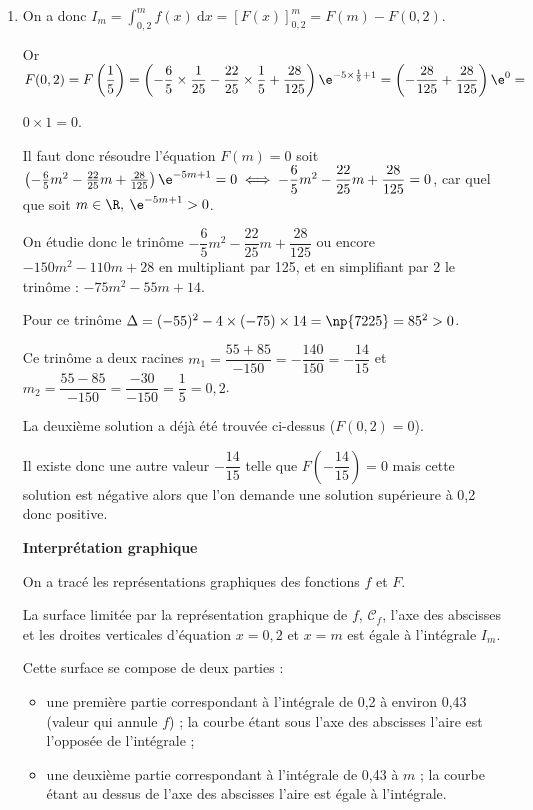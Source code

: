 \begin{enumerate}
\begin{enumerate}
$ \left(6x^2 - 2x + 2\right)\e^{-5x+ 1} = f(x)$.

Sur $\R$, \: $F'(x)  = f(x)$ montre que $F$ est une primitive de la fonction $f$.
		\item 


On a donc $I_m = \displaystyle\int_{0,2}^m f(x)\:\text{d}x = \left[F(x) \right]_{0,2}^m = F(m) - F(0,2).$

Or $F(0,2) = F\left(\dfrac15\right) = \left(-\dfrac65 \times \dfrac{1}{25} - \dfrac{22}{25}\times \dfrac{1}{5} + \dfrac{28}{125}\right)\e^{-5\times \frac{1}{5}+ 1} = \left(- \dfrac{28}{125} + \dfrac{28}{125} \right)\e^{0} = $

$0 \times 1 = 0$.

Il faut donc résoudre l'équation $F(m) = 0$ soit $\left(-\frac65m^2 - \frac{22}{25}m + \frac{28}{125}\right)\e^{-5m+ 1} = 0 \iff -\dfrac65 m^2 - \dfrac{22}{25}m + \dfrac{28}{125} = 0$, car quel que soit $m \in \R , \:\e^{-5m+ 1} > 0$.

On étudie donc le trinôme $-\dfrac65 m^2 - \dfrac{22}{25}m + \dfrac{28}{125}$ ou encore $-150m^2 - 110m + 28$ en multipliant par 125, et en simplifiant par 2 le trinôme : $- 75m^2 - 55m + 14$.

Pour ce trinôme $\Delta = (- 55)^2 - 4 \times (- 75) \times 14 = \np{7225} = 85^2 > 0$.

Ce trinôme a deux racines $m_1 = \dfrac{55 + 85}{-150} = - \dfrac{140}{150} = - \dfrac{14}{15}$ et $m_2 = \dfrac{55 - 85}{-150} =  \dfrac{- 30}{-150} = \dfrac15 = 0,2$.

La deuxième solution a déjà été trouvée ci-dessus ($F(0,2) = 0$).

Il existe donc une autre valeur $- \dfrac{14}{15}$ telle que $F\left(- \dfrac{14}{15}\right) = 0$ mais cette solution est négative alors que l'on demande une solution supérieure à 0,2 donc positive.

\textbf{Interprétation graphique}

On a tracé les représentations graphiques des fonctions $f$ et $F$.

La surface limitée par la représentation graphique de $f$, \: $\mathcal{C}_f$, l'axe des abscisses et les droites verticales d'équation $x = 0,2$ et $x = m$ est égale à l'intégrale $I_m$.

Cette surface se compose de deux parties :

\begin{itemize}
\item une première partie correspondant à l'intégrale de 0,2 à environ 0,43 (valeur qui annule $f$) ; la courbe étant sous l'axe des abscisses l'aire  est l'opposée de l'intégrale ;
\item une deuxième partie correspondant à l'intégrale de 0,43 à $m$  ; la courbe étant au dessus  de l'axe des abscisses l'aire  est égale à  l'intégrale.


\end{itemize}
\end{enumerate}
\end{enumerate}
